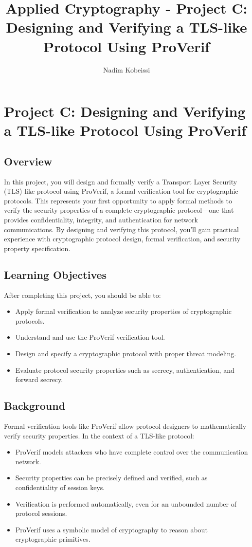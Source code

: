\documentclass[10pt,a4paper,american]{exam}
\title{Applied Cryptography - Project C: Designing and Verifying a TLS-like Protocol Using ProVerif}
\author{Nadim Kobeissi}
\begin{document}
\classhandoutheader
\section*{Project C: Designing and Verifying a TLS-like Protocol Using ProVerif}

\subsection*{Overview}
In this project, you will design and formally verify a Transport Layer Security (TLS)-like protocol using ProVerif, a formal verification tool for cryptographic protocols. This represents your first opportunity to apply formal methods to verify the security properties of a complete cryptographic protocol—one that provides confidentiality, integrity, and authentication for network communications. By designing and verifying this protocol, you'll gain practical experience with cryptographic protocol design, formal verification, and security property specification.

\subsection*{Learning Objectives}
After completing this project, you should be able to:
\begin{itemize}
	\item Apply formal verification to analyze security properties of cryptographic protocols.
	\item Understand and use the ProVerif verification tool.
	\item Design and specify a cryptographic protocol with proper threat modeling.
	\item Evaluate protocol security properties such as secrecy, authentication, and forward secrecy.
\end{itemize}

\subsection*{Background}
Formal verification tools like ProVerif allow protocol designers to mathematically verify security properties. In the context of a TLS-like protocol:
\begin{itemize}
	\item ProVerif models attackers who have complete control over the communication network.
	\item Security properties can be precisely defined and verified, such as confidentiality of session keys.
	\item Verification is performed automatically, even for an unbounded number of protocol sessions.
	\item ProVerif uses a symbolic model of cryptography to reason about cryptographic primitives.
\end{itemize}
\end{document}
